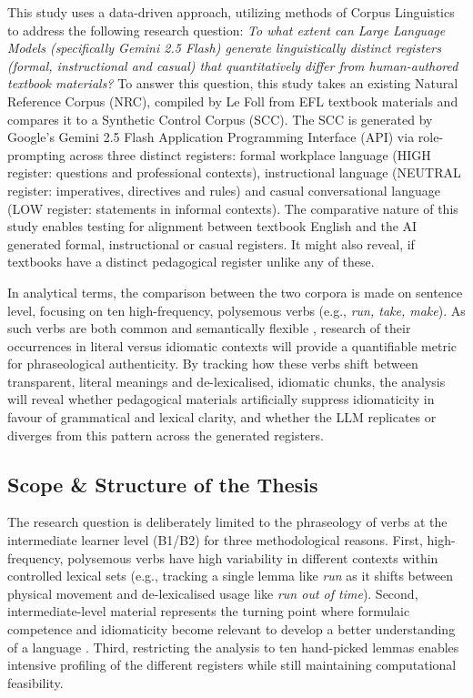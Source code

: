 \documentclass[11pt,a4paper]{article}
\begin{document}
This study uses a data-driven approach, utilizing methods of Corpus Linguistics to address the following research question: \textit{To what extent can Large Language Models (specifically Gemini 2.5 Flash) generate linguistically distinct registers (formal, instructional and casual) that quantitatively differ from human-authored textbook materials?} To answer this question, this study takes an existing Natural Reference Corpus (NRC), compiled by Le Foll \parencite*{leFoll2021a} from EFL textbook materials and compares it to a Synthetic Control Corpus (SCC). The SCC is generated by Google's Gemini 2.5 Flash Application Programming Interface (API) via role-prompting across three distinct registers: formal workplace language (HIGH register: questions and professional contexts), instructional language (NEUTRAL register: imperatives, directives and rules) and casual conversational language (LOW register: statements in informal contexts). The comparative nature of this study enables testing for alignment between textbook English and the AI generated formal, instructional or casual registers. It might also reveal, if textbooks have a distinct pedagogical register unlike any of these.

In analytical terms, the comparison between the two corpora is made on sentence level, focusing on ten high-frequency, polysemous verbs (e.g., \textit{run, take, make}). As such verbs are both common and semantically flexible \parencite[54--55]{stoeckelNGSL2019}, research of their occurrences in literal versus idiomatic contexts will provide a quantifiable metric for phraseological authenticity. By tracking how these verbs shift between transparent, literal meanings and de-lexicalised, idiomatic chunks, the analysis will reveal whether pedagogical materials artificially suppress idiomaticity in favour of grammatical and lexical clarity, and whether the LLM replicates or diverges from this pattern across the generated registers.

\subsection{Scope \& Structure of the Thesis}

The research question is deliberately limited to the phraseology of verbs at the intermediate learner level (B1/B2) for three methodological reasons. First, high-frequency, polysemous verbs have high variability in different contexts within controlled lexical sets (e.g., tracking a single lemma like \textit{run} as it shifts between physical movement and de-lexicalised usage like \textit{run out of time}). Second, intermediate-level material represents the turning point where formulaic competence and idiomaticity become relevant to develop a better understanding of a language \parencite[108]{schmaleFormulaicExpressionsForeign2022}. Third, restricting the analysis to ten hand-picked lemmas enables intensive profiling of the different registers while still maintaining computational feasibility.
\end{document}

